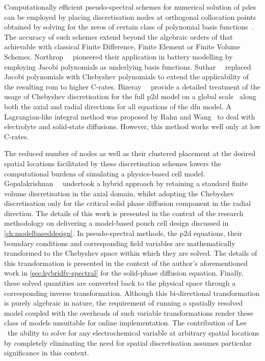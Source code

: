 Computationally    efficient     pseudo-spectral    schemes     for    numerical
solution   of   \glspl{pde}   can   be  employed   by   placing   discretisation
nodes    at    orthogonal    collocation     points    obtained    by    solving
for     the     zeros    of     certain     class     of    polynomial     basis
functions~\cite{Ferguson1971,Trefethen2000,Boyd2001,Shizgal2015,Dutykh2016}. The
accuracy of such  schemes extend beyond the algebraic orders  of that achievable
with  classical Finite  Difference,  Finite Element  or  Finite Volume  Schemes.
Northrop~\etal{}~\cite{Northrop2011}  pioneered  their  application  in  battery
modelling  by  employing  Jacobi  polynomials  as  underlying  basis  functions.
Suthar~\etal{}~\cite{Suthar2014}  replaced  Jacobi  polynomials  with  Chebyshev
polynomials to  extend the  applicability of the  resulting \gls{rom}  to higher
C-rates. Bizeray~\etal{}~\cite{Bizeray2015} provide a  detailed treatment of the
usage  of Chebyshev  discretisation for  the full  \gls{p2d} model  on a  global
scale \ie~along both the axial and radial directions for all equations of the
\gls{dfn}  model. A  Lagrangian-like integral  method was  proposed by  Rahn and
Wang~\cite{Rahn2013}  to  deal  with  electrolyte  and  solid-state  diffusions.
However, this method works well only at low C-rates.


The  reduced  number   of  nodes  as  well  as  their   clustered  placement  at
the  desired  spatial  locations  facilitated by  these  discretisation  schemes
lowers  the computational  burdens  of simulating  a  physics-based cell  model.
Gopalakrishnan~\etal{}~\cite{Gopalakrishnan2018} undertook a  hybrid approach by
retaining a  standard finite volume  discretisation in the axial  domain, whilst
adopting  the  Chebyshev  discretisation  only  for  the  critical  solid  phase
diffusion  component in  the  radial  direction. The  details  of  this work  is
presented in the context of the research methodology on delivering a model-based
pouch cell  design discussed  in \cref{ch:modelbaseddesign}.  In pseudo-spectral
methods, the  \gls{p2d} equations,  their boundary conditions  and corresponding
field variables  are mathematically  transformed to  the Chebyshev  space within
which they  are solved. The details  of this transformation is  presented in the
context  of the  author's  aforementioned  work in  \cref{sec:hybridfv-spectral}
for  the  solid-phase  diffusion  equation.  Finally,  these  solved  quantities
are  converted  back to  the  physical  space  through a  corresponding  inverse
transformation.   Although   this   bi-directional  transformation   is   purely
algebraic  in nature,  the requirement  of  running a  spatially resolved  model
coupled  with  the  overheads  of such  variable  transformations  render  these
class  of   models  unsuitable  for  online   implementation.  The  contribution
of   Lee~\etal~\cite{Lee2012a,Lee2012}  \ie~the   ability  to   solve  for   any
electrochemical   variable  at   arbitrary  spatial   locations  by   completely
eliminating the need for  spatial discretisation assumes particular significance
in this context.


